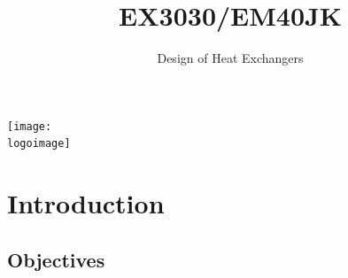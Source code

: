 \documentclass[10pt,compress,unknownkeysallowed]{beamer}
\institute{School of Engineering}
\title{EX3030/EM40JK}
\subtitle{Design of Heat Exchangers}
\date[ ]{ }
\newcommand{\logoimage}{../FigBanner/UoAHorizBanner}
\begin{document}
\begin{frame}
  \titlepage 
  \vfill%
  \begin{center}
    \texttt{[image: \\logoimage]}
  \end{center}
\end{frame}




\section{Introduction} 


\subsection{Objectives}
\end{document}
